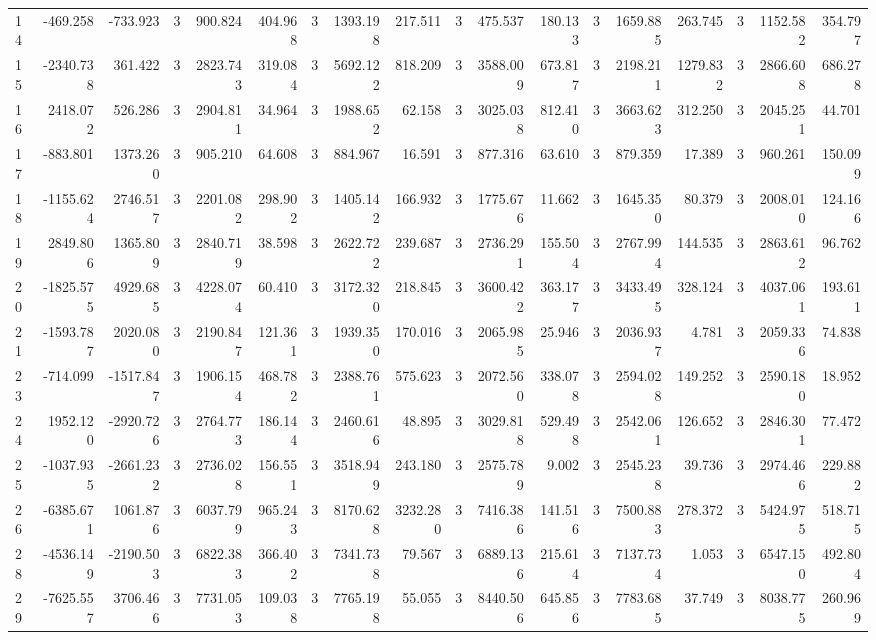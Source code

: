 \begin{table}[ht]
\begin{tabular}{lrrrrrrrrrrrrrrrrr}
14 & -469.258 & -733.923 & 3 & 900.824 & 404.968 & 3 & 1393.198 & 217.511 & 3 & 475.537 & 180.133 & 3 & 1659.885 & 263.745 & 3 & 1152.582 & 354.797 \\
15 & -2340.738 & 361.422 & 3 & 2823.743 & 319.084 & 3 & 5692.122 & 818.209 & 3 & 3588.009 & 673.817 & 3 & 2198.211 & 1279.832 & 3 & 2866.608 & 686.278 \\
16 & 2418.072 & 526.286 & 3 & 2904.811 & 34.964 & 3 & 1988.652 & 62.158 & 3 & 3025.038 & 812.410 & 3 & 3663.623 & 312.250 & 3 & 2045.251 & 44.701 \\
17 & -883.801 & 1373.260 & 3 & 905.210 & 64.608 & 3 & 884.967 & 16.591 & 3 & 877.316 & 63.610 & 3 & 879.359 & 17.389 & 3 & 960.261 & 150.099 \\
18 & -1155.624 & 2746.517 & 3 & 2201.082 & 298.902 & 3 & 1405.142 & 166.932 & 3 & 1775.676 & 11.662 & 3 & 1645.350 & 80.379 & 3 & 2008.010 & 124.166 \\
19 & 2849.806 & 1365.809 & 3 & 2840.719 & 38.598 & 3 & 2622.722 & 239.687 & 3 & 2736.291 & 155.504 & 3 & 2767.994 & 144.535 & 3 & 2863.612 & 96.762 \\
20 & -1825.575 & 4929.685 & 3 & 4228.074 & 60.410 & 3 & 3172.320 & 218.845 & 3 & 3600.422 & 363.177 & 3 & 3433.495 & 328.124 & 3 & 4037.061 & 193.611 \\
21 & -1593.787 & 2020.080 & 3 & 2190.847 & 121.361 & 3 & 1939.350 & 170.016 & 3 & 2065.985 & 25.946 & 3 & 2036.937 & 4.781 & 3 & 2059.336 & 74.838 \\
23 & -714.099 & -1517.847 & 3 & 1906.154 & 468.782 & 3 & 2388.761 & 575.623 & 3 & 2072.560 & 338.078 & 3 & 2594.028 & 149.252 & 3 & 2590.180 & 18.952 \\
24 & 1952.120 & -2920.726 & 3 & 2764.773 & 186.144 & 3 & 2460.616 & 48.895 & 3 & 3029.818 & 529.498 & 3 & 2542.061 & 126.652 & 3 & 2846.301 & 77.472 \\
25 & -1037.935 & -2661.232 & 3 & 2736.028 & 156.551 & 3 & 3518.949 & 243.180 & 3 & 2575.789 & 9.002 & 3 & 2545.238 & 39.736 & 3 & 2974.466 & 229.882 \\
26 & -6385.671 & 1061.876 & 3 & 6037.799 & 965.243 & 3 & 8170.628 & 3232.280 & 3 & 7416.386 & 141.516 & 3 & 7500.883 & 278.372 & 3 & 5424.975 & 518.715 \\
28 & -4536.149 & -2190.503 & 3 & 6822.383 & 366.402 & 3 & 7341.738 & 79.567 & 3 & 6889.136 & 215.614 & 3 & 7137.734 & 1.053 & 3 & 6547.150 & 492.804 \\
29 & -7625.557 & 3706.466 & 3 & 7731.053 & 109.038 & 3 & 7765.198 & 55.055 & 3 & 8440.506 & 645.856 & 3 & 7783.685 & 37.749 & 3 & 8038.775 & 260.969 \\

\end{tabular}
\end{table}
